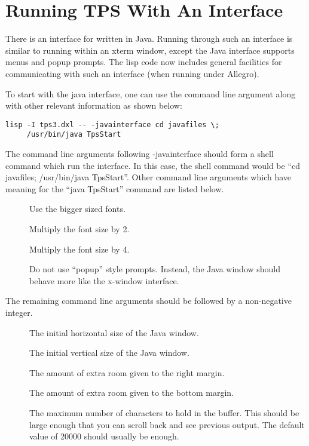 \chapter{Running TPS With An Interface}

There is an interface for \TPS written in Java.
Running \TPS through such an interface is similar to running
\TPS within an xterm window, except the Java interface
supports menus and popup prompts.  The \TPS lisp code
now includes general facilities for communicating with
such an interface (when running under Allegro).

To start \TPS with the java interface, one can use the command line
argument 
 along with other relevant information
as shown below:
\begin{verbatim}
lisp -I tps3.dxl -- -javainterface cd javafiles \;
     /usr/bin/java TpsStart
\end{verbatim}
The command line arguments following -javainterface
should form a shell command which run the interface.
In this case, the shell command would be ``cd javafiles; /usr/bin/java TpsStart''.
Other command line arguments which have meaning for the ``java TpsStart'' command
are listed below.
\begin{description}
\item[]  Use the bigger sized fonts.
\item[]  Multiply the font size by 2.
\item[]  Multiply the font size by 4.
\item[]  Do not use ``popup'' style prompts.
  Instead, the Java window should behave more like the x-window interface.
\end{description}
The remaining command line arguments should be followed by a non-negative integer.
\begin{description}
\item[]  The initial horizontal size of the Java window.
\item[]  The initial vertical size of the Java window.
\item[]  The amount of extra room given to the right margin.
\item[]  The amount of extra room given to the bottom margin.
\item[]  The maximum number of characters to hold in the buffer.
  This should be large enough that you can scroll back and see previous \TPS output.
  The default value of 20000 should usually be enough.
\end{description}


